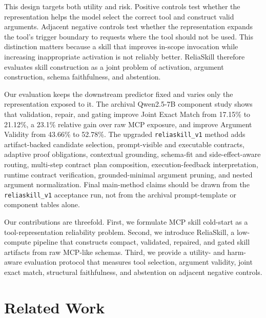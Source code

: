 \documentclass[11pt]{article}
\newcommand{\method}{ReliaSkill}
\begin{document}
This design targets both utility and risk. Positive controls test whether the representation helps the model select the correct tool and construct valid arguments. Adjacent negative controls test whether the representation expands the tool's trigger boundary to requests where the tool should not be used. This distinction matters because a skill that improves in-scope invocation while increasing inappropriate activation is not reliably better. \method{} therefore evaluates skill construction as a joint problem of activation, argument construction, schema faithfulness, and abstention.

Our evaluation keeps the downstream predictor fixed and varies only the representation exposed to it. The archival Qwen2.5-7B component study shows that validation, repair, and gating improve Joint Exact Match from 17.15\% to 21.12\%, a 23.1\% relative gain over raw MCP exposure, and improve Argument Validity from 43.66\% to 52.78\%. The upgraded \texttt{reliaskill\_v1} method adds artifact-backed candidate selection, prompt-visible and executable contracts, adaptive proof obligations, contextual grounding, schema-fit and side-effect-aware routing, multi-step contract plan composition, execution-feedback interpretation, runtime contract verification, grounded-minimal argument pruning, and nested argument normalization. Final main-method claims should be drawn from the \texttt{reliaskill\_v1} acceptance run, not from the archival prompt-template or component tables alone.

Our contributions are threefold. First, we formulate MCP skill cold-start as a tool-representation reliability problem. Second, we introduce \method{}, a low-compute pipeline that constructs compact, validated, repaired, and gated skill artifacts from raw MCP-like schemas. Third, we provide a utility- and harm-aware evaluation protocol that measures tool selection, argument validity, joint exact match, structural faithfulness, and abstention on adjacent negative controls.

\section{Related Work}
\label{sec:related_work}
\end{document}

